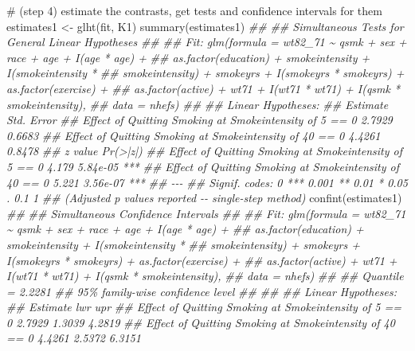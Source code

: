 \documentclass[
  10pt,
  a4paper,
]{book}
\newenvironment{Shaded}{\begin{snugshade}}{\end{snugshade}}
\newcommand{\CommentTok}[1]{\textcolor[rgb]{0.37,0.37,0.37}{#1}}
\newcommand{\DocumentationTok}[1]{\textcolor[rgb]{0.37,0.37,0.37}{\textit{#1}}}
\newcommand{\FunctionTok}[1]{\textcolor[rgb]{0.28,0.35,0.67}{#1}}
\newcommand{\NormalTok}[1]{\textcolor[rgb]{0.00,0.46,0.62}{#1}}
\newcommand{\OtherTok}[1]{\textcolor[rgb]{0.00,0.46,0.62}{#1}}
\begin{document}
\begin{Shaded}
\begin{Highlighting}[]
\CommentTok{\# (step 4) estimate the contrasts, get tests and confidence intervals for them}
\NormalTok{estimates1 }\OtherTok{\textless{}{-}} \FunctionTok{glht}\NormalTok{(fit, K1)}
  \FunctionTok{summary}\NormalTok{(estimates1)}
\DocumentationTok{\#\# }
\DocumentationTok{\#\#   Simultaneous Tests for General Linear Hypotheses}
\DocumentationTok{\#\# }
\DocumentationTok{\#\# Fit: glm(formula = wt82\_71 \textasciitilde{} qsmk + sex + race + age + I(age * age) + }
\DocumentationTok{\#\#     as.factor(education) + smokeintensity + I(smokeintensity * }
\DocumentationTok{\#\#     smokeintensity) + smokeyrs + I(smokeyrs * smokeyrs) + as.factor(exercise) + }
\DocumentationTok{\#\#     as.factor(active) + wt71 + I(wt71 * wt71) + I(qsmk * smokeintensity), }
\DocumentationTok{\#\#     data = nhefs)}
\DocumentationTok{\#\# }
\DocumentationTok{\#\# Linear Hypotheses:}
\DocumentationTok{\#\#                                                         Estimate Std. Error}
\DocumentationTok{\#\# Effect of Quitting Smoking at Smokeintensity of 5 == 0    2.7929     0.6683}
\DocumentationTok{\#\# Effect of Quitting Smoking at Smokeintensity of 40 == 0   4.4261     0.8478}
\DocumentationTok{\#\#                                                         z value Pr(\textgreater{}|z|)    }
\DocumentationTok{\#\# Effect of Quitting Smoking at Smokeintensity of 5 == 0    4.179 5.84e{-}05 ***}
\DocumentationTok{\#\# Effect of Quitting Smoking at Smokeintensity of 40 == 0   5.221 3.56e{-}07 ***}
\DocumentationTok{\#\# {-}{-}{-}}
\DocumentationTok{\#\# Signif. codes:  0 \textquotesingle{}***\textquotesingle{} 0.001 \textquotesingle{}**\textquotesingle{} 0.01 \textquotesingle{}*\textquotesingle{} 0.05 \textquotesingle{}.\textquotesingle{} 0.1 \textquotesingle{} \textquotesingle{} 1}
\DocumentationTok{\#\# (Adjusted p values reported {-}{-} single{-}step method)}
  \FunctionTok{confint}\NormalTok{(estimates1)}
\DocumentationTok{\#\# }
\DocumentationTok{\#\#   Simultaneous Confidence Intervals}
\DocumentationTok{\#\# }
\DocumentationTok{\#\# Fit: glm(formula = wt82\_71 \textasciitilde{} qsmk + sex + race + age + I(age * age) + }
\DocumentationTok{\#\#     as.factor(education) + smokeintensity + I(smokeintensity * }
\DocumentationTok{\#\#     smokeintensity) + smokeyrs + I(smokeyrs * smokeyrs) + as.factor(exercise) + }
\DocumentationTok{\#\#     as.factor(active) + wt71 + I(wt71 * wt71) + I(qsmk * smokeintensity), }
\DocumentationTok{\#\#     data = nhefs)}
\DocumentationTok{\#\# }
\DocumentationTok{\#\# Quantile = 2.2281}
\DocumentationTok{\#\# 95\% family{-}wise confidence level}
\DocumentationTok{\#\#  }
\DocumentationTok{\#\# }
\DocumentationTok{\#\# Linear Hypotheses:}
\DocumentationTok{\#\#                                                         Estimate lwr    upr   }
\DocumentationTok{\#\# Effect of Quitting Smoking at Smokeintensity of 5 == 0  2.7929   1.3039 4.2819}
\DocumentationTok{\#\# Effect of Quitting Smoking at Smokeintensity of 40 == 0 4.4261   2.5372 6.3151}


\end{Highlighting}
\end{Shaded}
\end{document}

